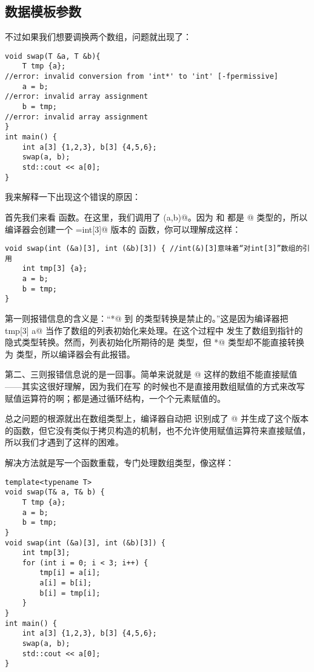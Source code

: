 \subsection*{数据模板参数}
不过如果我们想要调换两个数组，问题就出现了：
\begin{lstlisting}
void swap(T &a, T &b){
    T tmp {a};
//error: invalid conversion from 'int*' to 'int' [-fpermissive]
    a = b;
//error: invalid array assignment
    b = tmp;
//error: invalid array assignment
}
int main() {
    int a[3] {1,2,3}, b[3] {4,5,6};
    swap(a, b);
    std::cout << a[0];
}
\end{lstlisting}
我来解释一下出现这个错误的原因：\par
首先我们来看 \lstinline@main@ 函数。在这里，我们调用了 \lstinline@swap(a,b)@。因为 \lstinline@a@ 和 \lstinline@b@ 都是 \lstinline@int[3]@ 类型的，所以编译器会创建一个 \lstinline@T=int[3]@ 版本的 \lstinline@swap@ 函数，你可以理解成这样：
\begin{lstlisting}
void swap(int (&a)[3], int (&b)[3]) { //int(&)[3]意味着“对int[3]”数组的引用
    int tmp[3] {a};
    a = b;
    b = tmp;
}
\end{lstlisting}
第一则报错信息的含义是：``\lstinline@int*@ 到 \lstinline@int@ 的类型转换是禁止的。''这是因为编译器把 \lstinline@int tmp[3] {a}@ 当作了数组的列表初始化来处理。在这个过程中 \lstinline@a@ 发生了数组到指针的隐式类型转换。然而，列表初始化所期待的是 \lstinline@int@ 类型，但 \lstinline@int*@ 类型却不能直接转换为 \lstinline@int@ 类型，所以编译器会有此报错。\par
第二、三则报错信息说的是一回事。简单来说就是 \lstinline@int[3]@ 这样的数组不能直接赋值——其实这很好理解，因为我们在写 \lstinline@valarri@ 的时候也不是直接用数组赋值的方式来改写赋值运算符的啊；都是通过循环结构，一个个元素赋值的。\par
总之问题的根源就出在数组类型上，编译器自动把 \lstinline@T@ 识别成了 \lstinline@int[3]@ 并生成了这个版本的函数，但它没有类似于拷贝构造的机制，也不允许使用赋值运算符来直接赋值，所以我们才遇到了这样的困难。\par
解决方法就是写一个函数重载，专门处理数组类型，像这样：
\begin{lstlisting}
template<typename T>
void swap(T& a, T& b) {
    T tmp {a};
    a = b;
    b = tmp;
}
void swap(int (&a)[3], int (&b)[3]) {
    int tmp[3];
    for (int i = 0; i < 3; i++) {
        tmp[i] = a[i];
        a[i] = b[i];
        b[i] = tmp[i];
    }
}
int main() {
    int a[3] {1,2,3}, b[3] {4,5,6};
    swap(a, b);
    std::cout << a[0];
}
\end{lstlisting}
